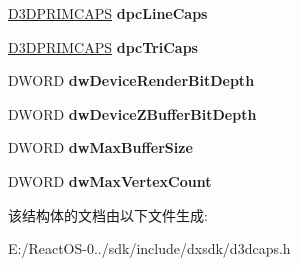 \begin{DoxyCompactItemize}
\hyperlink{struct___d3_d_prim_caps}{D3\+D\+P\+R\+I\+M\+C\+A\+PS} {\bfseries dpc\+Line\+Caps}
\item 
\mbox{\label{struct___d3_d_device_desc1_ae33f8310bf598254f3b2accaf138766d}} 
\hyperlink{struct___d3_d_prim_caps}{D3\+D\+P\+R\+I\+M\+C\+A\+PS} {\bfseries dpc\+Tri\+Caps}
\item 
\mbox{\label{struct___d3_d_device_desc1_a8b363843238ce5a8b5a2d70ac0f8a9c8}} 
D\+W\+O\+RD {\bfseries dw\+Device\+Render\+Bit\+Depth}
\item 
\mbox{\label{struct___d3_d_device_desc1_a4c83775c9c3a70a05e72cf27c0ec2ae5}} 
D\+W\+O\+RD {\bfseries dw\+Device\+Z\+Buffer\+Bit\+Depth}
\item 
\mbox{\label{struct___d3_d_device_desc1_ae6e634b4e535c8b5e91b3f628dea93c7}} 
D\+W\+O\+RD {\bfseries dw\+Max\+Buffer\+Size}
\item 
\mbox{\label{struct___d3_d_device_desc1_afecd4e025f3c984107b6ad18233f78ac}} 
D\+W\+O\+RD {\bfseries dw\+Max\+Vertex\+Count}
\end{DoxyCompactItemize}


该结构体的文档由以下文件生成\+:\begin{DoxyCompactItemize}
\item 
E\+:/\+React\+O\+S-\/0../sdk/include/dxsdk/d3dcaps.\+h\end{DoxyCompactItemize}
